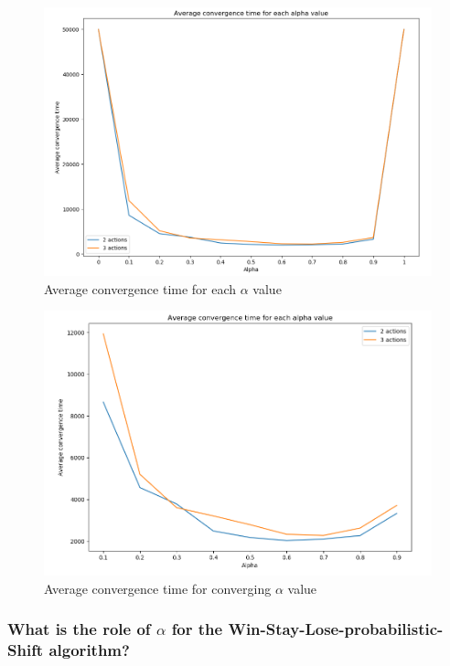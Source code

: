 \documentclass{article}
\begin{document}
\begin{figure}[H]
  \centering
  \includegraphics[scale=0.36]{fig/coord-convergenceAlpha.png}
  \caption{Average convergence time for each $\alpha$ value}
  \label{fig:coord-convergenceAlpha}
\end{figure}

\begin{figure}[H]
  \centering
  \includegraphics[scale=0.41]{fig/coord-convergenceAlpha-bis.png}
  \caption{Average convergence time for converging $\alpha$ value}
  \label{fig:coord-convergenceAlpha-bis}
\end{figure}


\subsubsection{What is the role of $\alpha$ for the Win-Stay-Lose-probabilistic-Shift algorithm?} 
\end{document}
